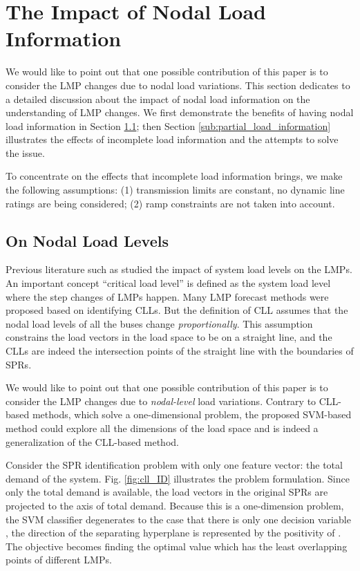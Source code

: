 \documentclass[letterpaper, 11pt]{article}
\theoremstyle{plain}
\theoremstyle{definition}
\begin{document}
\section{The Impact of Nodal Load Information} \label{sec:impact_of_nodal_load_information}
We would like to point out that one possible contribution of this paper is to consider the LMP changes due to nodal
load variations. This section dedicates to a detailed discussion about the impact of nodal load information on the understanding of LMP changes. We first demonstrate the benefits of having nodal load information in Section \ref{sub:how_the_nodal_load_levels_help_us_}; then Section \ref{sub:partial_load_information} illustrates the effects of incomplete load information and the attempts to solve the issue.

To concentrate on the effects that incomplete load information brings, we make the following assumptions: (1) transmission limits are constant, no dynamic line ratings are being considered; (2) ramp constraints are not taken into account.


\subsection{On Nodal Load Levels} \label{sub:how_the_nodal_load_levels_help_us_}
Previous literature such as \cite{Li2007} studied the impact of system load levels on the LMPs. An important concept ``critical load level'' is defined as the system load level where the step changes of LMPs happen. Many LMP forecast methods were proposed based on identifying CLLs. But the definition of CLL assumes that the nodal load levels of all the buses change \emph{proportionally}. This assumption constrains the load vectors in the load space to be on a straight line, and the CLLs are indeed the intersection points of the straight line with the boundaries of SPRs.


We would like to point out that one possible contribution of this paper is to consider the LMP changes due to \emph{nodal-level} load variations.
Contrary to CLL-based methods, which solve a one-dimensional problem, the proposed SVM-based method could explore all the dimensions of the load space and is indeed a generalization of the CLL-based method.

Consider the SPR identification problem with only one feature vector: the total demand of the system. 
Fig. \ref{fig:cll_ID} illustrates the problem formulation. Since only the total demand  is available, the load vectors in the original SPRs are projected to the axis of total demand. Because this is a one-dimension problem, the SVM classifier degenerates to the case that there is only one decision variable , the direction of the separating hyperplane  is represented by the positivity of . The objective becomes finding the optimal value  which has the least overlapping points of different LMPs.
\end{document}
